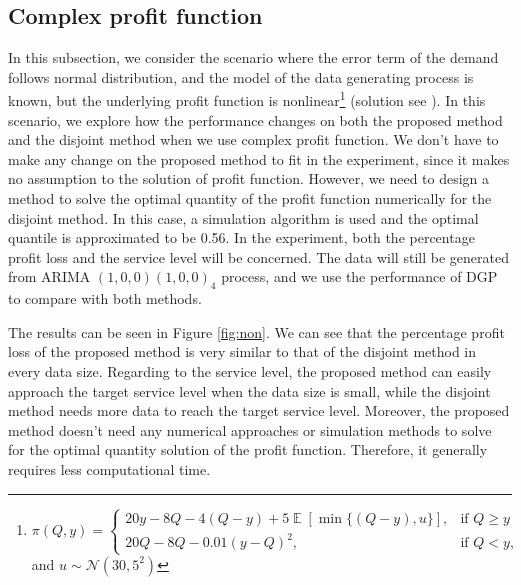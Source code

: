 \documentclass{article}
\DeclareMathOperator{\E}{\mathbb{E}}
\begin{document}
\subsection{Complex profit function}
In this subsection, we consider the scenario where the error term of the demand follows normal distribution, and the model of the data generating process is known, but the underlying profit function is nonlinear\footnote{$
        \pi(Q,y)=
        \begin{cases}
            20y-8Q-4(Q-y)+5\E[\min \{(Q-y),u\}],& \text{if } Q\geq y\\
            20Q-8Q-0.01(y-Q)^2,& \text{if } Q< y,
        \end{cases}$ and $u\sim \mathcal{N}(30,5^2)$} (solution see \cite{KK18}).
In this scenario, we explore how the performance changes on both the proposed method and the disjoint method when we use complex profit function. We don't have to make any change on the proposed method to fit in the experiment, since it makes no assumption to the solution of profit function. However, we need to design a method to solve the optimal quantity of the profit function numerically for the disjoint method. In this case, a simulation algorithm is used and the optimal quantile is approximated to be 0.56. In the experiment, both the percentage profit loss and the service level will be concerned. The data will still be generated from ARIMA $(1,0,0)(1,0,0)_4$ process, and we use the performance of DGP to compare with both methods. 

The results can be seen in Figure \ref{fig:non}. We can see that the percentage profit loss of the proposed method is very similar to that of the disjoint method in every data size. Regarding to the service level, the proposed method can easily approach the target service level when the data size is small, while the disjoint method needs more data to reach the target service level. Moreover, the proposed method doesn't need any numerical approaches or simulation methods to solve for the optimal quantity solution of the profit function. Therefore, it generally requires less computational time.
\end{document}
